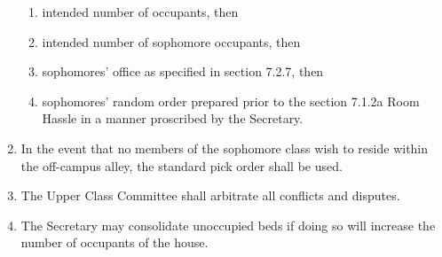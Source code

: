 \documentclass[10pt]{article} %
\begin{document}
\begin{enumerate}
\begin{enumerate}
\item intended number of occupants, then
\item intended number of sophomore occupants, then
\item sophomores’ office as specified in section 7.2.7, then
\item sophomores’ random order prepared prior to the section 7.1.2a Room Hassle in a manner proscribed by the Secretary.
\end{enumerate}
\item In the event that no members of the sophomore class wish to reside within the off-campus alley, the standard pick order shall be used. 
\item The Upper Class Committee shall arbitrate all conflicts and disputes.
\item The Secretary may consolidate unoccupied beds if doing so will increase the number of occupants of the house.
\end{enumerate}
\end{document}
